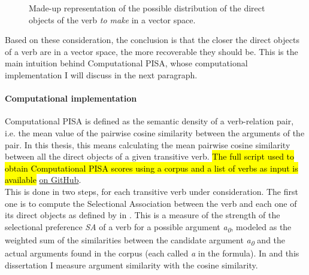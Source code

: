 \begin{figure}[htb]
\caption{Made-up representation of the possible distribution of the direct objects of the verb \textit{to make} in a vector space.}
\centering
{}
\end{figure}

Based on these consideration, the conclusion is that the closer the direct objects of a verb are in a vector space, the more recoverable they should be. This is the main intuition behind Computational PISA, whose computational implementation I will discuss in the next paragraph.

\paragraph{Computational implementation} Computational PISA is defined as the semantic density of a verb-relation pair, i.e. the mean value of the pairwise cosine similarity between the arguments of the pair. In this thesis, this means calculating the mean pairwise cosine similarity between all the direct objects of a given transitive verb. \hl{The full script used to obtain Computational PISA scores using a corpus and a list of verbs as input is available} \href{http://www.overleaf.com}{on GitHub}. \\
This is done in two steps, for each transitive verb under consideration. The first one is to compute the Selectional Association between the verb and each one of its direct objects as defined by \textcite{Erk2007, ErkEtAl2010} in . This is a measure of the strength of the selectional preference \textit{SA} of a verb for a possible argument \textit{a\textsubscript{0}}, modeled as the weighted sum of the similarities between the candidate argument \textit{a\textsubscript{0}} and the actual arguments found in the corpus (each called \textit{a} in the formula). In \textcite{CappelliLenciPISA} and this dissertation I measure argument similarity with the cosine similarity.

